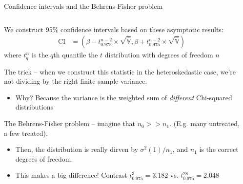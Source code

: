 \documentclass[notes,11pt, aspectratio=169]{beamer}
\newenvironment{wideitemize}{\itemize\addtolength{\itemsep}{10pt}}{\enditemize}
\begin{document}
\begin{frame}{Confidence intervals and the Behrens-Fisher problem}
\begin{columns}[T] %
\begin{column}{.9\textwidth}
  \begin{wideitemize}
  \item We construct 95\% confidence intervals based on these asymptotic results:
    \begin{align*}
      \text{CI} &= \left(\beta - t^{n-2}_{0.975}\times \sqrt{\hat{\mathbb{V}}}, \beta + t^{n-2}_{0.975}\times \sqrt{\hat{\mathbb{V}}}\right)
      \end{align*}
      where $t^{n}_{q}$ is the $q$th quantile the $t$ distribution with degrees of freedom $n$
    \item The trick -- when we construct this statistic in the
      heteroskedastic case, we're not dividing by the right finite
      sample variance.
      \begin{itemize}
      \item Why? Because the variance is the weighted sum of \emph{different} Chi-squared distributions
      \end{itemize}
    \item The Behrens-Fisher problem -- imagine that $n_{0} >> n_{1}$. (E.g. many untreated, a few treated).
      \begin{itemize}
      \item Then, the distribution is really dirven by $\sigma^{2}(1)/n_{1}$, and $n_{1}$ is the correct degrees of freedom.
      \item This makes a big difference! Contrast $t^{3}_{0.975} = 3.182$  vs. $t^{28}_{0.975}=2.048$
      \end{itemize}
  \end{wideitemize}
  \end{column}%
  \hfill%
  \begin{column}{.5\textwidth}
  \end{column}
\end{columns}
\end{frame}
\end{document}
